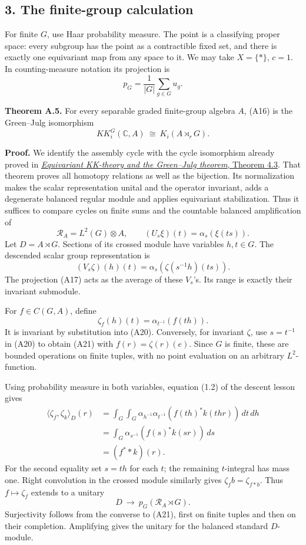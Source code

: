 \documentclass[
  11pt,
]{article}
\begin{document}
\subsection{3. The finite-group
calculation}\label{the-finite-group-calculation}

For finite \(G\), use Haar probability measure. The point is a
classifying proper space: every subgroup has the point as a contractible
fixed set, and there is exactly one equivariant map from any space to
it. We may take \(X=\{*\}\), \(c=1\). In counting-measure notation its
projection is \[
p_G=\frac1{|G|}\sum_{g\in G}u_g.
\tag{A17}
\]

\textbf{Theorem A.5.} For every separable graded finite-group algebra
\(A\), (A16) is the Green--Julg isomorphism \[
KK_i^G(\mathbb C,A)\ \cong\ K_i(A\rtimes_rG).
\tag{A18}
\]

\textbf{Proof.} We identify the assembly cycle with the cycle
isomorphism already proved in
\href{KT-KK-17.html\#4-invariant-compact-operators-and-green-julg}{\emph{Equivariant
KK-theory and the Green--Julg theorem}, Theorem 4.3}. That theorem
proves all homotopy relations as well as the bijection. Its
normalization makes the scalar representation unital and the operator
invariant, adds a degenerate balanced regular module and applies
equivariant stabilization. Thus it suffices to compare cycles on finite
sums and the countable balanced amplification of \[
\mathcal R_A=L^2(G)\otimes A,\qquad
(U_s\xi)(t)=\alpha_s(\xi(ts)).
\tag{A19}
\] Let \(D=A\rtimes G\). Sections of its crossed module have variables
\(h,t\in G\). The descended scalar group representation is \[
(V_s\zeta)(h)(t)=\alpha_s(\zeta(s^{-1}h)(ts)).
\tag{A20}
\] The projection (A17) acts as the average of these \(V_s\)'s. Its
range is exactly their invariant submodule.

For \(f\in C(G,A)\), define \[
\zeta_f(h)(t)=\alpha_{t^{-1}}(f(th)).
\tag{A21}
\] It is invariant by substitution into (A20). Conversely, for invariant
\(\zeta\), use \(s=t^{-1}\) in (A20) to obtain (A21) with
\(f(r)=\zeta(r)(e)\). Since \(G\) is finite, these are bounded
operations on finite tuples, with no point evaluation on an arbitrary
\(L^2\)-function.

Using probability measure in both variables, equation (1.2) of the
descent lesson gives \[
\begin{aligned}
\langle\zeta_f,\zeta_k\rangle_D(r)
&=\int_G\int_G
 \alpha_{h^{-1}}\alpha_{t^{-1}}
      (f(th)^*k(thr))\,dt\,dh\\
&=\int_G\alpha_{s^{-1}}(f(s)^*k(sr))\,ds\\
&=(f^**k)(r).
\end{aligned}
\tag{A22}
\] For the second equality set \(s=th\) for each \(t\); the remaining
\(t\)-integral has mass one. Right convolution in the crossed module
similarly gives \(\zeta_f b=\zeta_{f*b}\). Thus \(f\mapsto\zeta_f\)
extends to a unitary \[
D\ \longrightarrow\ p_G(\mathcal R_A\rtimes G).
\tag{A23}
\] Surjectivity follows from the converse to (A21), first on finite
tuples and then on their completion. Amplifying gives the unitary for
the balanced standard \(D\)-module.
\end{document}
